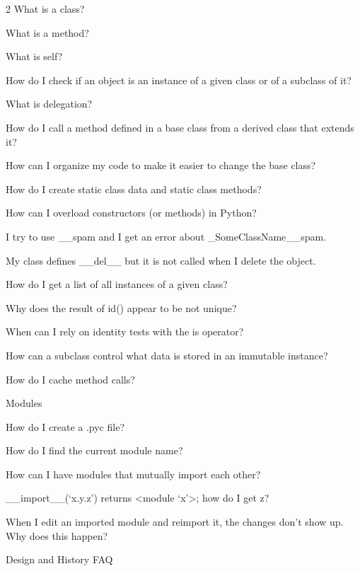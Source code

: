 \documentclass [8pt] {extarticle}
\begin{document}
\begin {multicols} {2}
            What is a class?

            What is a method?

            What is self?

            How do I check if an object is an instance of a given class or of a subclass of it?

            What is delegation?

            How do I call a method defined in a base class from a derived class that extends it?

            How can I organize my code to make it easier to change the base class?

            How do I create static class data and static class methods?

            How can I overload constructors (or methods) in Python?

            I try to use \_\_spam and I get an error about \_SomeClassName\_\_spam.

            My class defines \_\_del\_\_ but it is not called when I delete the object.

            How do I get a list of all instances of a given class?

            Why does the result of id() appear to be not unique?

            When can I rely on identity tests with the is operator?

            How can a subclass control what data is stored in an immutable instance?

            How do I cache method calls?

        Modules

            How do I create a .pyc file?

            How do I find the current module name?

            How can I have modules that mutually import each other?

            \_\_import\_\_(‘x.y.z’) returns <module ‘x’>; how do I get z?

            When I edit an imported module and reimport it, the changes don’t show up. Why does this happen?

    \end {multicols}

    Design and History FAQ
\end{document}
